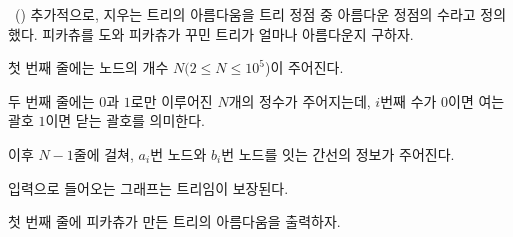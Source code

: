 \begin{problem}{\kcpcprobpretty\ (\kcpcprobprettyshort)}
    추가적으로, 지우는 트리의 아름다움을 트리 정점 중 아름다운 정점의 수라고 정의했다. 피카츄를 도와 피카츄가 꾸민 트리가 얼마나 아름다운지 구하자.
    
    \InputFile
    첫 번째 줄에는 노드의 개수 $N(2 \leq N \leq 10^5$)이 주어진다.
    
    두 번째 줄에는 $0$과 $1$로만 이루어진 $N$개의 정수가 주어지는데, $i$번째 수가 $0$이면 여는 괄호 $1$이면 닫는 괄호를 의미한다.
    
    이후 $N-1$줄에 걸쳐, $a_i$번 노드와 $b_i$번 노드를 잇는 간선의 정보가 주어진다.
    
    입력으로 들어오는 그래프는 트리임이 보장된다.
    
    \OutputFile
    첫 번째 줄에 피카츄가 만든 트리의 아름다움을 출력하자.
    
    \Examples
    \begin{example}
    \end{example}
\end{problem}

